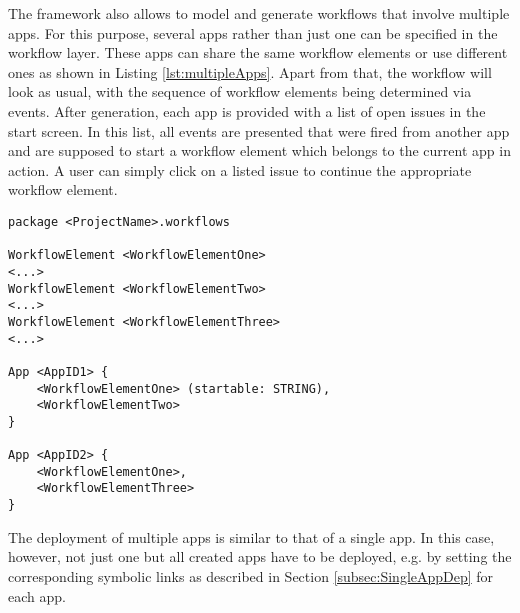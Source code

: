 
The \MD framework also allows to model and generate workflows that involve multiple apps. For this purpose, several apps rather than just one can be specified in the workflow layer. These apps can share the same workflow elements or use different ones as shown in Listing \ref{lst:multipleApps}. Apart from that, the workflow will look as usual, with the sequence of workflow elements being determined via events. After generation, each app is provided with a list of open issues in the start screen. In this list, all events are presented that were fired from another app and are supposed to start a workflow element which belongs to the current app in action. A user can simply click on a listed issue to continue the appropriate workflow element.

\begin{lstlisting}[language=MD2, label=lst:multipleApps, caption=Workflow definition for multiple apps]
package <ProjectName>.workflows

WorkflowElement <WorkflowElementOne>
<...>
WorkflowElement <WorkflowElementTwo>
<...>
WorkflowElement <WorkflowElementThree>
<...>

App <AppID1> {
	<WorkflowElementOne> (startable: STRING),
	<WorkflowElementTwo>
}

App <AppID2> {
	<WorkflowElementOne>,
	<WorkflowElementThree>
}
\end{lstlisting}

The deployment of multiple apps is similar to that of a single app. In this case, however, not just one but all created apps have to be deployed, e.g. by setting the corresponding symbolic links as described in Section \ref{subsec:SingleAppDep} for each app.
